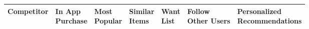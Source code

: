 \begin{table}[H]
    \centering
    \begin{tabular}{l l l l l l l}
        \toprule
        Competitor &
        \multicolumn{1}{l}{\parbox{1.3cm}{ In App \\ Purchase}} &
        \multicolumn{1}{l}{\parbox{1.0cm}{ Most \\ Popular}} &
        \multicolumn{1}{l}{\parbox{1.0cm}{ Similar \\ Items}} &
        \multicolumn{1}{l}{\parbox{1.0cm}{ Want \\ List}} &
        \multicolumn{1}{l}{\parbox{1.9cm}{ Follow \\ Other Users}} &
        \multicolumn{1}{l}{\parbox{2.6cm}{ Personalized \\ Recommendations}} \\ \midrule


\end{tabular}
\end{table}
